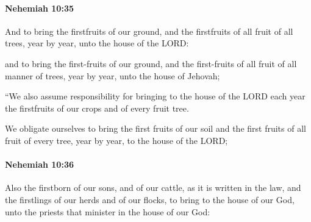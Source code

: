 		\paragraph{Nehemiah 10:35} %
			\label{NEHEMIAH-10-35}

			And to bring the firstfruits of our ground, and the firstfruits of all fruit of all trees, year by year, unto the house of the LORD:

			\begin{versebox}
					\item[BHS] 
					\item[LXX] 
					\item[ASV] and to bring the first-fruits of our ground, and the first-fruits of all fruit of all manner of trees, year by year, unto the house of Jehovah;
					\item[NIV] “We also assume responsibility for bringing to the house of the LORD each year the firstfruits of our crops and of every fruit tree.
					\item[NRSV] We obligate ourselves to bring the first fruits of our soil and the first fruits of all fruit of every tree, year by year, to the house of the LORD;
			\end{versebox}

		\paragraph{Nehemiah 10:36} %
			\label{NEHEMIAH-10-36}

			Also the firstborn of our sons, and of our cattle, as it is written in the law, and the firstlings of our herds and of our flocks, to bring to the house of our God, unto the priests that minister in the house of our God:


